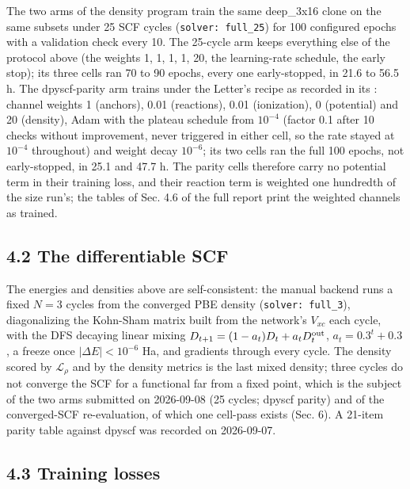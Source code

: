 \documentclass[10pt,a4paper]{article}
\begin{document}
The two arms of the density program train the same deep\_3x16 clone on the same subsets under 25 SCF cycles (\texttt{solver: full\_25}) for 100 configured epochs with a validation check every 10. The 25-cycle arm keeps everything else of the protocol above (the weights 1, 1, 1, 1, 20, the learning-rate schedule, the early stop); its three cells ran 70 to 90 epochs, every one early-stopped, in 21.6 to 56.5 h. The dpyscf-parity arm trains under the Letter's recipe as recorded in its : channel weights 1 (anchors), 0.01 (reactions), 0.01 (ionization), 0 (potential) and 20 (density), Adam with the plateau schedule from $10^{-4}$ (factor 0.1 after 10 checks without improvement, never triggered in either cell, so the rate stayed at $10^{-4}$ throughout) and weight decay $10^{-6}$; its two cells ran the full 100 epochs, not early-stopped, in 25.1 and 47.7 h. The parity cells therefore carry no potential term in their training loss, and their reaction term is weighted one hundredth of the size run's; the tables of Sec. 4.6 of the full report print the weighted channels as trained.

\subsection*{4.2 The differentiable SCF}

The energies and densities above are self-consistent: the manual backend runs a fixed $N = 3$ cycles from the converged PBE density (\texttt{solver: full\_3}), diagonalizing the Kohn-Sham matrix built from the network's $V_{xc}$ each cycle, with the DFS decaying linear mixing $D_{t+1} = (1 - a_t) D_t + a_t D^{\rm out}_t$, $a_t = 0.3^{t} + 0.3$, a freeze once $|\Delta E| < 10^{-6}$ Ha, and gradients through every cycle. The density scored by $\mathcal{L}_\rho$ and by the density metrics is the last mixed density; three cycles do not converge the SCF for a functional far from a fixed point, which is the subject of the two arms submitted on 2026-09-08 (25 cycles; dpyscf parity) and of the converged-SCF re-evaluation, of which one cell-pass exists (Sec. 6). A 21-item parity table against dpyscf was recorded on 2026-09-07.

\subsection*{4.3 Training losses}
\end{document}
